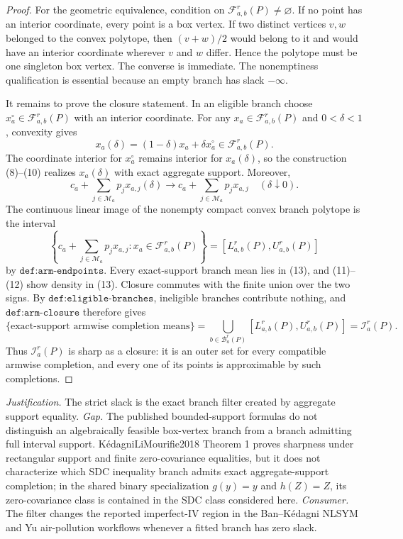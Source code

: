 \documentclass{article}
\begin{document}
\begin{proof}
For the geometric equivalence, condition on \(\mathcal F_{a,b}^r(P)\ne\varnothing\).  If no point has an interior coordinate, every point is a box vertex.  If two distinct vertices \(v,w\) belonged to the convex polytope, then \((v+w)/2\) would belong to it and would have an interior coordinate wherever \(v\) and \(w\) differ.  Hence the polytope must be one singleton box vertex.  The converse is immediate.  The nonemptiness qualification is essential because an empty branch has slack \(-\infty\).

It remains to prove the closure statement.  In an eligible branch choose \(x_a^\circ\in\mathcal F_{a,b}^r(P)\) with an interior coordinate.  For any \(x_a\in\mathcal F_{a,b}^r(P)\) and \(0<\delta<1\), convexity gives
\[
 x_a(\delta)=(1-\delta)x_a+\delta x_a^\circ\in\mathcal F_{a,b}^r(P).          \tag{11}
\]
The coordinate interior for \(x_a^\circ\) remains interior for \(x_a(\delta)\), so the construction (8)--(10) realizes \(x_a(\delta)\) with exact aggregate support.  Moreover,
\[
 c_a+\sum_{j\in\mathcal M_a}p_jx_{a,j}(\delta)
 \longrightarrow
 c_a+\sum_{j\in\mathcal M_a}p_jx_{a,j}
 \quad(\delta\downarrow0).                                                    \tag{12}
\]
The continuous linear image of the nonempty compact convex branch polytope is the interval
\[
 \left\{c_a+\sum_{j\in\mathcal M_a}p_jx_{a,j}:x_a\in\mathcal F_{a,b}^r(P)\right\}
 =[L_{a,b}^r(P),U_{a,b}^r(P)]                                                  \tag{13}
\]
by \(\texttt{def:arm-endpoints}\).  Every exact-support branch mean lies in (13), and (11)--(12) show density in (13).  Closure commutes with the finite union over the two signs.  By \(\texttt{def:eligible-branches}\), ineligible branches contribute nothing, and \(\texttt{def:arm-closure}\) therefore gives
\[
 \overline{\{\text{exact-support armwise completion means}\}}
 =\bigcup_{b\in\mathcal B_a^r(P)}[L_{a,b}^r(P),U_{a,b}^r(P)]
 =\mathcal I_a^r(P).                                                          \tag{14}
\]
Thus \(\mathcal I_a^r(P)\) is sharp as a closure: it is an outer set for every compatible armwise completion, and every one of its points is approximable by such completions.
\end{proof}
\par\smallskip\noindent \textit{Justification.} The strict slack is the exact branch filter created by aggregate support equality. \textit{Gap.} The published bounded-support formulas do not distinguish an algebraically feasible box-vertex branch from a branch admitting full interval support. KédagniLiMourifie2018 Theorem 1 proves sharpness under rectangular support and finite zero-covariance equalities, but it does not characterize which SDC inequality branch admits exact aggregate-support completion; in the shared binary specialization \(g(y)=y\) and \(h(Z)=Z\), its zero-covariance class is contained in the SDC class considered here. \textit{Consumer.} The filter changes the reported imperfect-IV region in the Ban--Kédagni NLSYM and Yu air-pollution workflows whenever a fitted branch has zero slack.
\end{document}
